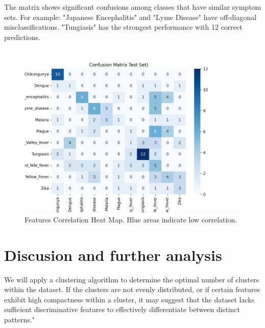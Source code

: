 \documentclass{article}
\begin{document}
The matrix shows significant confusions among classes that have similar symptom sets. For example:
"Japanese Encephalitis" and "Lyme Disease" have off-diagonal misclassifications.
"Tungiasis" has the strongest performance with 12 correct predictions.

\begin{figure}[H]  
    \centering
    \includegraphics[width=1\linewidth]{Confusion_Matrix_Test_Set.png}
    \caption{Features Correlation Heat Map. Blue areas indicate low correlation.}
    \vspace{-1em} %
    \end{figure}

\section{Discusion and further analysis}
We will apply a clustering algorithm to determine the optimal number of clusters within the dataset. 
If the clusters are not evenly distributed, or if certain features exhibit high compactness within a cluster,
it may suggest that the dataset lacks sufficient discriminative features to effectively differentiate between distinct patterns."
\end{document}
